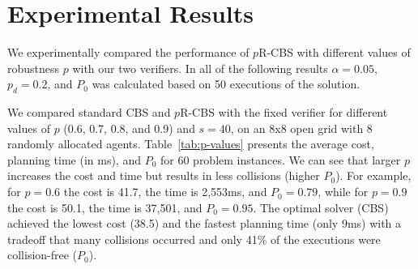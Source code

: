 \documentclass{article}
\newcommand{\prcbs}{$p$R-CBS\xspace}
\begin{document}
\section{Experimental Results}
\label{sec:experiments1}

We experimentally compared the performance of \prcbs{} with different values of robustness $p$ with our two verifiers. In all of the following results $\alpha=0.05$, $p_d=0.2$, and $P_0$ was calculated based on 50 executions of the solution. 

\begin{table}[t]
\centering
{}
\caption{Average planning cost, runtime and for CBS and \prcbs{} with different values of $p$,  over 8x8 open grid.}
\label{tab:p-values}
\end{table}

We compared standard CBS and \prcbs{} with the fixed verifier for different values of $p$ (0.6, 0.7, 0.8, and 0.9) and $s=40$, on an 8x8 open grid with 8 randomly allocated agents. Table~\ref{tab:p-values} presents the average cost, planning time (in ms), and $P_0$ for 60 problem instances.
We can see that larger $p$ increases the cost and time but results in less collisions (higher $P_0$). For example, for $p=0.6$ the cost is 41.7, the time is 2,553ms, and $P_0=0.79$, while for $p=0.9$ the cost is 50.1, the time is 37,501, and $P_0=0.95$. The optimal solver (CBS) achieved the lowest cost (38.5) and the fastest planning time (only 9ms) with a tradeoff that many collisions occurred and only 41\% of the executions were collision-free ($P_0$).
\end{document}
